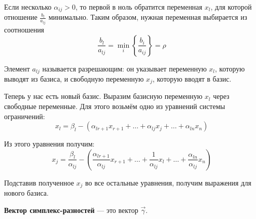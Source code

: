 \documentclass[17pt]{extarticle}
\begin{document}
Если несколько \( \alpha_{ij} > 0 \), то первой в ноль обратится переменная \( x_l \), для которой отношение \( \frac{b_l}{a_{lj}} \) минимально. Таким образом, нужная переменная выбирается из соотношения
\[
    \frac{b_l}{a_{lj}} = \min\limits_i \left\{ \frac{b_i}{a_{ij}} \right\} = \rho
\]

Элемент \( a_{lj} \) называется разрешающим: он указывает переменную \( x_l \), которую выводят из базиса, и свободную переменную \( x_j \), которую вводят в базис.

Теперь у нас есть новый базис. Выразим базисную переменную \( x_l \) через свободные переменные. Для этого возьмём одно из уравнений системы ограничений:
\[
    x_l = \beta_l - (\alpha_{l r+1}x_{r+1} + \dots + \alpha_{lj}x_j + \dots + \alpha_{ln}x_n)
\]

Из этого уравнения получим:
\[
    x_j = \frac{\beta_l}{\alpha_{lj}} - \left( \frac{\alpha_{l r+1}}{\alpha_{lj}}x_{r+1} + \dots + \frac{1}{\alpha_{lj}}x_l + \dots + \frac{\alpha_{ln}}{\alpha_{lj}}x_n \right)
\]

Подставив полученное \( x_j \) во все остальные уравнения, получим выражения для нового базиса.

\textbf{Вектор симплекс-разностей} — это вектор \( \vec{\gamma} \).
\end{document}
